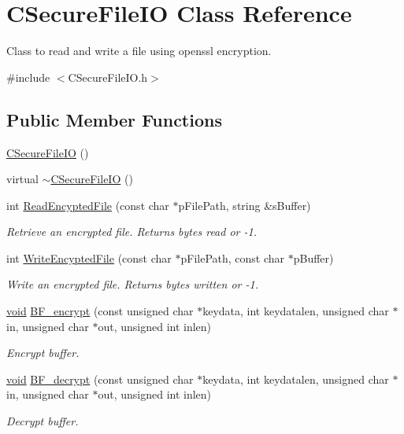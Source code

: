 \hypertarget{class_c_secure_file_i_o}{\section{\-C\-Secure\-File\-I\-O \-Class \-Reference}
\label{class_c_secure_file_i_o}
}


\-Class to read and write a file using openssl encryption.  




{\ttfamily \#include $<$\-C\-Secure\-File\-I\-O.\-h$>$}

\subsection*{\-Public \-Member \-Functions}
\begin{DoxyCompactItemize}
\item 
\hyperlink{class_c_secure_file_i_o_a38da84ec9e56170cdfff609f3cbcc4f0}{\-C\-Secure\-File\-I\-O} ()
\item 
virtual \hyperlink{class_c_secure_file_i_o_ac4d83da8c95a9f864c9f89819f05219a}{$\sim$\-C\-Secure\-File\-I\-O} ()
\item 
int \hyperlink{class_c_secure_file_i_o_a329a8677443725b37ee21a291bf0d5db}{\-Read\-Encypted\-File} (const char $\ast$p\-File\-Path, string \&s\-Buffer)
\begin{DoxyCompactList}\small\item\em \-Retrieve an encrypted file. \-Returns bytes read or -\/1. \end{DoxyCompactList}\item 
int \hyperlink{class_c_secure_file_i_o_a6cc4fc174952e378eb86e96631bdcdc5}{\-Write\-Encypted\-File} (const char $\ast$p\-File\-Path, const char $\ast$p\-Buffer)
\begin{DoxyCompactList}\small\item\em \-Write an encrypted file. \-Returns bytes written or -\/1. \end{DoxyCompactList}\item 
\hyperlink{_cpclient_8h_a6464f7480a0fd0ee170cba12b2c0497f}{void} \hyperlink{class_c_secure_file_i_o_adee11b95c6772322bc421191b055a1a6}{\-B\-F\-\_\-encrypt} (const unsigned char $\ast$keydata, int keydatalen, unsigned char $\ast$in, unsigned char $\ast$out, unsigned int inlen)
\begin{DoxyCompactList}\small\item\em \-Encrypt buffer. \end{DoxyCompactList}\item 
\hyperlink{_cpclient_8h_a6464f7480a0fd0ee170cba12b2c0497f}{void} \hyperlink{class_c_secure_file_i_o_a2ab08cd2ca5f762108dec56ac15ba890}{\-B\-F\-\_\-decrypt} (const unsigned char $\ast$keydata, int keydatalen, unsigned char $\ast$in, unsigned char $\ast$out, unsigned int inlen)
\begin{DoxyCompactList}\small\item\em \-Decrypt buffer. \end{DoxyCompactList}\end{DoxyCompactItemize}
